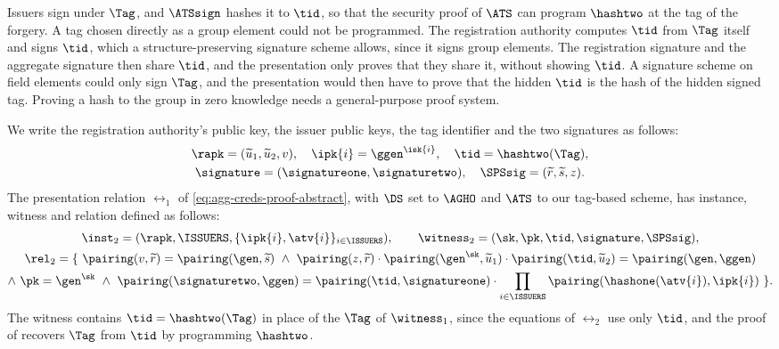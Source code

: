 Issuers sign under $\Tag$, and
$\ATSsign$ hashes it to $\tid$, so that the security proof of $\ATS$ can program
$\hashtwo$ at the tag of the forgery. A tag chosen directly as a group element
could not be programmed. The registration authority computes $\tid$ from $\Tag$
itself and signs $\tid$, which a structure-preserving signature scheme allows,
since it signs group elements. The registration signature and the aggregate
signature then share $\tid$, and the presentation only proves that they share
it, without showing $\tid$. A signature scheme on field elements could only sign
$\Tag$, and the presentation would then have to prove that the hidden $\tid$ is
the hash of the hidden signed tag. Proving a hash to the group in zero knowledge
needs a general-purpose proof system.

We write the registration authority's public key, the issuer public keys, the
tag identifier and the two signatures as follows:
%
\begin{gather*}
%
  \rapk = (\widetilde{u}_1, \widetilde{u}_2, v), \quad \ipk{i} =
\ggen^{\isk{i}}, \quad \tid = \hashtwo(\Tag), \\ \signature = (\signatureone,
\signaturetwo), \quad \SPSsig = (\widetilde{r}, \widetilde{s}, z).
%
\end{gather*}
%
The presentation relation $\rel_1$ of \eqref{eq:agg-creds-proof-abstract},
with $\DS$ set to $\AGHO$ and $\ATS$ to our tag-based scheme, has instance,
witness and relation defined as follows:
%
\begin{equation}\label{eq:agg-creds-proof-original}\begin{gathered}
%
  \inst_2 = (\rapk, \ISSUERS, \{\ipk{i}, \atv{i}\}_{i \in \ISSUERS}), \qquad \witness_2
= (\sk, \pk, \tid, \signature, \SPSsig), \\
%
  \rel_2 = \{\ \pairing(v, \widetilde{r}) = \pairing(\gen, \widetilde{s}) \
\wedge\ \pairing(z, \widetilde{r}) \cdot \pairing(\gen^\sk,
\widetilde{u}_1)\cdot \pairing(\tid, \widetilde{u}_2) = \pairing(\gen, \ggen) \\
  \wedge\ \pk = \gen^\sk \ \wedge\ \pairing(\signaturetwo, \ggen) =
\pairing(\tid,
\signatureone)\cdot\prod_{i\in\ISSUERS}\pairing(\hashone(\atv{i}), \ipk{i})\ \}.
%
\end{gathered}\end{equation}
%
The witness contains $\tid = \hashtwo(\Tag)$ in place of the $\Tag$ of
$\witness_1$, since the equations of $\rel_2$ use only $\tid$, and the proof of
\Cref{lem:agg-creds-sigma} recovers $\Tag$ from $\tid$ by programming
$\hashtwo$.

